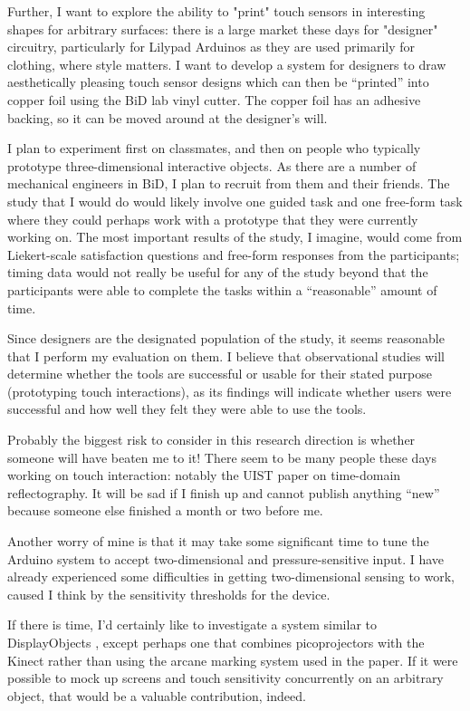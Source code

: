\documentclass[11pt]{article}
\begin{document}
Further, I want to explore the ability to "print" touch sensors in interesting shapes for arbitrary surfaces: there is a large market these days for "designer" circuitry, particularly for Lilypad Arduinos as they are used primarily for clothing, where style matters. I want to develop a system for designers to draw aesthetically pleasing touch sensor designs which can then be “printed” into copper foil using the BiD lab vinyl cutter. The copper foil has an adhesive backing, so it can be moved around at the designer's will.

I plan to experiment first on classmates, and then on people who typically prototype three-dimensional interactive objects. As there are a number of mechanical engineers in BiD, I plan to recruit from them and their friends. The study that I would do would likely involve one guided task and one free-form task where they could perhaps work with a prototype that they were currently working on. The most important results of the study, I imagine, would come from Liekert-scale satisfaction questions and free-form responses from the participants; timing data would not really be useful for any of the study beyond that the participants were able to complete the tasks within a “reasonable” amount of time.

Since designers are the designated population of the study, it seems reasonable that I perform my evaluation on them. I believe that observational studies will determine whether the tools are successful or usable for their stated purpose (prototyping touch interactions), as its findings will indicate whether users were successful and how well they felt they were able to use the tools.

Probably the biggest risk to consider in this research direction is whether someone will have beaten me to it! There seem to be many people these days working on touch interaction: notably the UIST paper on time-domain reflectography. It will be sad if I finish up and cannot publish anything “new” because someone else finished a month or two before me.

Another worry of mine is that it may take some significant time to tune the Arduino system to accept two-dimensional and pressure-sensitive input. I have already experienced some difficulties in getting two-dimensional sensing to work, caused I think by the sensitivity thresholds for the device.

If there is time, I'd certainly like to investigate a system similar to DisplayObjects \cite{DISPLAYOBJECTS}, except perhaps one that combines picoprojectors with the Kinect rather than using the arcane marking system used in the paper.  If it were possible to mock up screens and touch sensitivity concurrently on an arbitrary object, that would be a valuable contribution, indeed.

{}

\end{document}

